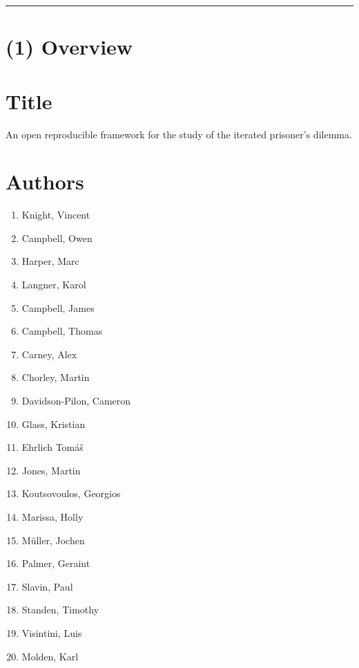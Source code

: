 \documentclass{jors}
\begin{document}
\pagestyle{fancy}
\renewcommand\headrule{}
\rhead{\textcolor{gray}{UP JORS software Latex paper template version 0.1}}

\rule{\textwidth}{1pt}

\section*{(1) Overview}\label{sec:sec:overview}

\vspace{0.5cm}

\section*{Title}

An open reproducible framework for the study of the iterated prisoner's
dilemma.

\section*{Authors}

\begin{multicols}{2}
    \begin{enumerate}[noitemsep,topsep=0pt]
        \item Knight, Vincent
        \item Campbell, Owen
        \item Harper, Marc
        \item Langner, Karol
        \item Campbell, James
        \item Campbell, Thomas
        \item Carney, Alex
        \item Chorley, Martin
        \item Davidson-Pilon, Cameron
        \item Glass, Kristian
        \item Ehrlich Tom{\'a}{\v s}
        \item Jones, Martin
        \item Koutsovoulos, Georgios
        \item Marissa, Holly
        \item M{\"u}ller, Jochen
        \item Palmer, Geraint
        \item Slavin, Paul
        \item Standen, Timothy
        \item Visintini, Luis
        \item Molden, Karl
    \end{enumerate}
\end{multicols}
\end{document}
